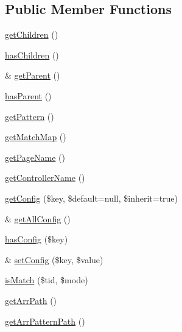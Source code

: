 \subsection*{Public Member Functions}
\begin{DoxyCompactItemize}
\item 
\hyperlink{interfaceWEPPO_1_1Routing_1_1PageInterface_a18714cffa24f13359ffecbd4ce428162}{get\+Children} ()
\item 
\hyperlink{interfaceWEPPO_1_1Routing_1_1PageInterface_a321e58c8fcb2a407c21c817545759f8c}{has\+Children} ()
\item 
\& \hyperlink{interfaceWEPPO_1_1Routing_1_1PageInterface_ae76da781ea5d5cf13985b8d1b566a3c5}{get\+Parent} ()
\item 
\hyperlink{interfaceWEPPO_1_1Routing_1_1PageInterface_aab91f189ec2f97b89871ef9924ad7df6}{has\+Parent} ()
\item 
\hyperlink{interfaceWEPPO_1_1Routing_1_1PageInterface_a9d44ab592a46b6c80446b8f89deceef6}{get\+Pattern} ()
\item 
\hyperlink{interfaceWEPPO_1_1Routing_1_1PageInterface_a82687a49dfcc6cccef859d3c3db4ddba}{get\+Match\+Map} ()
\item 
\hyperlink{interfaceWEPPO_1_1Routing_1_1PageInterface_ac984816c6a450f784bd74a25a641f47b}{get\+Page\+Name} ()
\item 
\hyperlink{interfaceWEPPO_1_1Routing_1_1PageInterface_a6494364ff68812a4a11ec4ce57303529}{get\+Controller\+Name} ()
\item 
\hyperlink{interfaceWEPPO_1_1Routing_1_1PageInterface_a65655df41a3c284f00e05d34401944c5}{get\+Config} (\$key, \$default=null, \$inherit=true)
\item 
\& \hyperlink{interfaceWEPPO_1_1Routing_1_1PageInterface_a7c7459eed63f0803eda1374c3390d72a}{get\+All\+Config} ()
\item 
\hyperlink{interfaceWEPPO_1_1Routing_1_1PageInterface_a19ba6431614c6377f64eac26f5615db5}{has\+Config} (\$key)
\item 
\& \hyperlink{interfaceWEPPO_1_1Routing_1_1PageInterface_a201f38331805fadb2083cec7819b332b}{set\+Config} (\$key, \$value)
\item 
\hyperlink{interfaceWEPPO_1_1Routing_1_1PageInterface_a528908a659e462068fba2cba70c23030}{is\+Match} (\$tid, \$mode)
\item 
\hyperlink{interfaceWEPPO_1_1Routing_1_1PageInterface_afca560718a526bfdc3b246cd89ebe8c4}{get\+Arr\+Path} ()
\item 
\hyperlink{interfaceWEPPO_1_1Routing_1_1PageInterface_ae879d4623d786fefad43bfcb8022d51c}{get\+Arr\+Pattern\+Path} ()

\end{DoxyCompactItemize}
